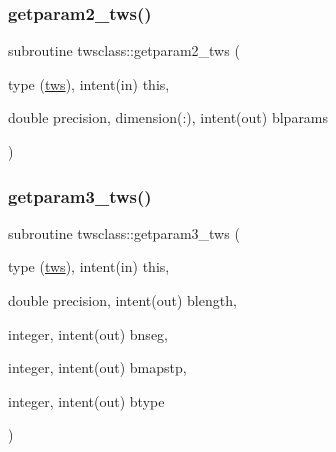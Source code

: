 \mbox{\label{namespacetwsclass_a82176cb7e562eb7a78fffed55cbac554}} 
\subsubsection{\texorpdfstring{getparam2\_tws()}{getparam2\_tws()}}
{\footnotesize\ttfamily subroutine twsclass\+::getparam2\+\_\+tws (\begin{DoxyParamCaption}\item[{type (\mbox{\hyperlink{namespacetwsclass_structtwsclass_1_1tws}{tws}}), intent(in)}]{this,  }\item[{double precision, dimension(\+:), intent(out)}]{blparams }\end{DoxyParamCaption})}

\mbox{\label{namespacetwsclass_a07f751992638ce181255eef670d54c50}} 
\subsubsection{\texorpdfstring{getparam3\_tws()}{getparam3\_tws()}}
{\footnotesize\ttfamily subroutine twsclass\+::getparam3\+\_\+tws (\begin{DoxyParamCaption}\item[{type (\mbox{\hyperlink{namespacetwsclass_structtwsclass_1_1tws}{tws}}), intent(in)}]{this,  }\item[{double precision, intent(out)}]{blength,  }\item[{integer, intent(out)}]{bnseg,  }\item[{integer, intent(out)}]{bmapstp,  }\item[{integer, intent(out)}]{btype }\end{DoxyParamCaption})}

\mbox{\label{namespacetwsclass_a1681f57f6e70160ddb0f6e59f4cd5349}} 
